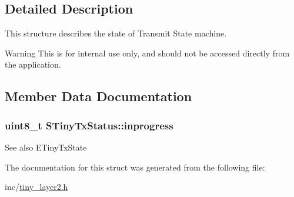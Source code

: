 \subsection{Detailed Description}
This structure describes the state of Transmit State machine. \begin{DoxyWarning}{Warning}
This is for internal use only, and should not be accessed directly from the application. 
\end{DoxyWarning}


\subsection{Member Data Documentation}
\hypertarget{structSTinyTxStatus_a8d7fa9861ba2adb1fd4ad4689548d238}{}
\subsubsection[{inprogress}]{\setlength{\rightskip}{0pt plus 5cm}uint8\+\_\+t S\+Tiny\+Tx\+Status\+::inprogress}\label{structSTinyTxStatus_a8d7fa9861ba2adb1fd4ad4689548d238}
\begin{DoxySeeAlso}{See also}
E\+Tiny\+Tx\+State 
\end{DoxySeeAlso}


The documentation for this struct was generated from the following file\+:\begin{DoxyCompactItemize}
\item 
inc/\hyperlink{tiny__layer2_8h}{tiny\+\_\+layer2.\+h}\end{DoxyCompactItemize}

